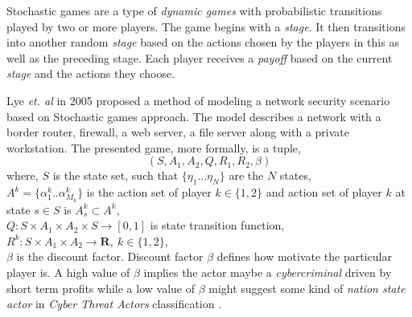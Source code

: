 \documentclass[conference]{IEEEtran}
\begin{document}
Stochastic games \cite{wiki-stochastic} are a type of \textit{dynamic games} with probabilistic transitions played by two or more players.
The game begins with a \textit{stage}.
It then transitions into another random \textit{stage} based on the actions chosen by the players in this as well as the preceding stage.
Each player receives a \textit{payoff} based on the current \textit{stage} and the actions they choose.

Lye \textit{et. al} \cite{stochastic} in 2005 proposed a method of modeling a network security scenario based on Stochastic games approach.
The model describes a network with a border router, firewall, a web server, a file server along with a private workstation.
The presented game, more formally, is a tuple,
\begin{equation} \label{sto_tup}
    (S, A_{1}, A_{2}, Q, R_{1}, R_{2}, \beta)
\end{equation}
where,
$S$ is the state set, such that $ \{\eta_{1}...\eta_{N}\}$ are the $N$ states,\\
$A^{k} = \{\alpha^{k}_{1}..\alpha^{k}_{M_{k}}\}$ is the action set of player $ k \in \{1, 2\}$ and action set of player $k$ at state $s\in S$ is $A^{k}_{s} \subset A^{k}$,\\
$Q: S\times A_{1} \times A_{2} \times S \rightarrow [0,1]$ is state transition function,\\
$R^{k}: S\times A_{1} \times A_{2} \rightarrow \mathbf{R},\ k \in \{1,2\}$,\\
$\beta$ is the discount factor.
Discount factor $\beta$ defines how motivate the particular player is.
A high value of $\beta$ implies the actor maybe a \textit{cybercriminal} driven by short term profits while a low value of $\beta$ might suggest some kind of \textit{nation state actor} in \textit{Cyber Threat Actors} classification \cite{cyberactor}.
\end{document}

